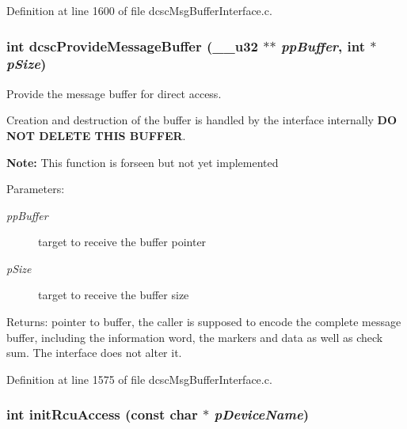 Definition at line 1600 of file dcsc\-Msg\-Buffer\-Interface.c.\hypertarget{group__dcsc__msg__buffer__access_gf7be7371f7530e8eb6e07e6f0d969b04}{
\subsubsection[dcscProvideMessageBuffer]{\setlength{\rightskip}{0pt plus 5cm}int dcsc\-Provide\-Message\-Buffer (\_\-\_\-u32 $\ast$$\ast$ {\em pp\-Buffer}, int $\ast$ {\em p\-Size})}}
\label{group__dcsc__msg__buffer__access_gf7be7371f7530e8eb6e07e6f0d969b04}


Provide the message buffer for direct access. 

Creation and destruction of the buffer is handled by the interface internally {\bf DO NOT DELETE THIS BUFFER}.\par
 {\bf Note:} This function is forseen but not yet implemented \begin{Desc}
\item[Parameters:]
\begin{description}
\item[{\em pp\-Buffer}]target to receive the buffer pointer \item[{\em p\-Size}]target to receive the buffer size \end{description}
\end{Desc}
\begin{Desc}
\item[Returns:]pointer to buffer, the caller is supposed to encode the complete message buffer, including the information word, the markers and data as well as check sum. The interface does not alter it. \end{Desc}


Definition at line 1575 of file dcsc\-Msg\-Buffer\-Interface.c.\hypertarget{group__dcsc__msg__buffer__access_gfc4448a8f5f9654cf54ad494f1558594}{
\subsubsection[initRcuAccess]{\setlength{\rightskip}{0pt plus 5cm}int init\-Rcu\-Access (const char $\ast$ {\em p\-Device\-Name})}}
\label{group__dcsc__msg__buffer__access_gfc4448a8f5f9654cf54ad494f1558594}


